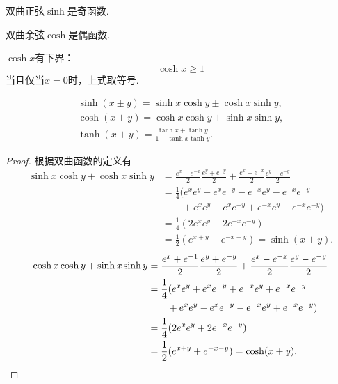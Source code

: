 \begin{property}
双曲正弦\(\sinh\)是奇函数.
\end{property}

\begin{property}
双曲余弦\(\cosh\)是偶函数.
\end{property}

\begin{property}
\(\cosh x\)有下界：\begin{equation*}
	\cosh x \geq 1
\end{equation*}
当且仅当\(x=0\)时，上式取等号.
\end{property}

\begin{theorem}
\begin{gather}
	\sinh(x \pm y) = \sinh x\cosh y \pm \cosh x\sinh y, \\
	\cosh(x \pm y) = \cosh x\cosh y \pm \sinh x\sinh y, \\
	\tanh(x + y) = \frac{\tanh x + \tanh y}{1 + \tanh x\tanh y}.
\end{gather}
\begin{proof}
根据双曲函数的定义有
\begin{align*}
	\sinh x\cosh y+\cosh x\sinh y
	&= \frac{e^x - e^{-x}}{2} \frac{e^y + e^{-y}}{2}
		+ \frac{e^x + e^{-x}}{2} \frac{e^y - e^{-y}}{2} \\
	&= \frac{1}{4} (e^x e^y + e^x e^{-y} - e^{-x} e^y - e^{-x} e^{-y} \\
	&\qquad+ e^x e^y - e^x e^{-y} + e^{-x} e^y - e^{-x} e^{-y}) \\
	&= \frac{1}{4} (2 e^x e^y - 2 e^{-x} e^{-y}) \\
	&= \frac12 (e^{x+y} - e^{-x-y}) = \sinh(x+y).
\end{align*}
\begin{align*}
	\cosh x\cosh y+\sinh x\sinh y
	&= \frac{e^x + e^{-1}}{2} \frac{e^y + e^{-y}}{2}
		+ \frac{e^x - e^{-x}}{2} \frac{e^y - e^{-y}}{2} \\
	&= \frac{1}{4} (e^x e^y + e^x e^{-y} + e^{-x} e^y + e^{-x} e^{-y} \\
	&\qquad+ e^x e^y - e^x e^{-y} - e^{-x} e^y + e^{-x} e^{-y}) \\
	&= \frac{1}{4} (2 e^x e^y + 2 e^{-x} e^{-y}) \\
	&= \frac12 (e^{x+y} + e^{-x-y}) = \cosh(x+y).
	\qedhere
\end{align*}
\end{proof}
\end{theorem}

